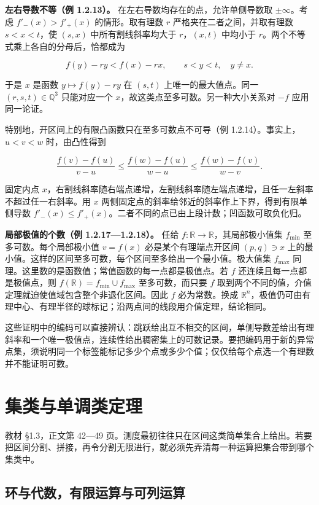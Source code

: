 \documentclass[11pt,a4paper]{article}
\begin{document}
\textbf{左右导数不等（例 1.2.13）。} 在左右导数均存在的点，允许单侧导数取 \(\pm\infty\)。考虑 \(f'_-(x)>f'_+(x)\) 的情形。取有理数 \(r\) 严格夹在二者之间，并取有理数 \(s<x<t\)，使 \((s,x)\) 中所有割线斜率均大于 \(r\)，\((x,t)\) 中均小于 \(r\)。两个不等式乘上各自的分母后，恰都成为

\[
f(y)-ry<f(x)-rx,\qquad s<y<t,\quad y\ne x.
\]

于是 \(x\) 是函数 \(y\mapsto f(y)-ry\) 在 \((s,t)\) 上唯一的最大值点。同一 \((r,s,t)\in\mathbb Q^3\) 只能对应一个 \(x\)，故这类点至多可数。另一种大小关系对 \(-f\) 应用同一论证。

特别地，开区间上的有限凸函数只在至多可数点不可导（例 1.2.14）。事实上，\(u<v<w\) 时，由凸性得到

\[
\frac{f(v)-f(u)}{v-u}
\le\frac{f(w)-f(u)}{w-u}
\le\frac{f(w)-f(v)}{w-v}.
\]

固定内点 \(x\)，右割线斜率随右端点递增，左割线斜率随左端点递增，且任一左斜率不超过任一右斜率。用 \(x\) 两侧固定点的斜率给邻近的斜率作上下界，得到有限单侧导数 \(f'_-(x)\le f'_+(x)\)。二者不同的点已由上段计数；凹函数可取负化归。

\textbf{局部极值的个数（例 1.2.17---1.2.18）。} 任给 \(f:\mathbb R\to\mathbb R\)，其局部极小值集 \(f_{\min}\) 至多可数。每个局部极小值 \(v=f(x)\) 必是某个有理端点开区间 \((p,q)\ni x\) 上的最小值。这样的区间至多可数，每个区间至多给出一个最小值。极大值集 \(f_{\max}\) 同理。这里数的是函数值；常值函数的每一点都是极值点。若 \(f\) 还连续且每一点都是极值点，则 \(f(\mathbb R)=f_{\min}\cup f_{\max}\) 至多可数，而只要 \(f\) 取到两个不同的值，介值定理就迫使值域包含整个非退化区间。因此 \(f\) 必为常数。换成 \(\mathbb R^n\)，极值仍可由有理中心、有理半径的球标记；沿两点间的线段用介值定理，结论相同。

这些证明中的编码可以直接辨认：跳跃给出互不相交的区间，单侧导数差给出有理斜率和一个唯一极值点，连续性给出稠密集上的可数记录。要把编码用于新的异常点集，须说明同一个标签能标记多少个点或多少个值；仅仅给每个点选一个有理数并不能证明可数。
\section{集类与单调类定理}

教材 §1.3，正文第 42---49 页。测度最初往往只在区间这类简单集合上给出。若要把区间分割、拼接，再令分割无限进行，就必须先弄清每一种运算把集合带到哪个集类中。

\subsection{环与代数，有限运算与可列运算}
\end{document}

